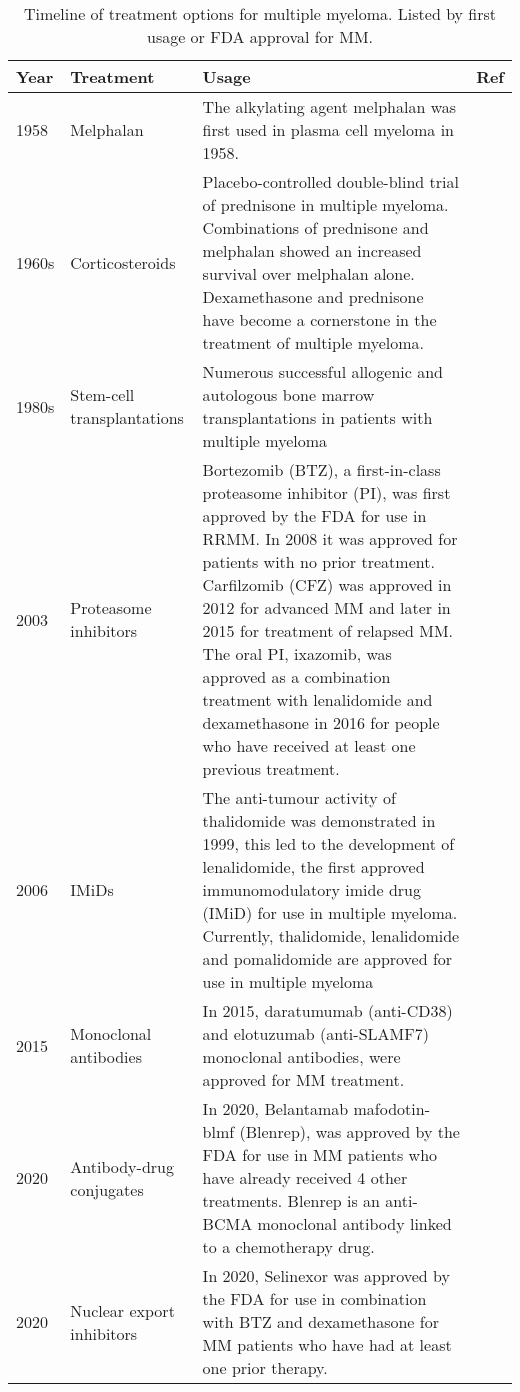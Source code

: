 %
%
\begin{table}[hpt]
\centering
\begin{tabular}{|p{1cm}|p{2.8cm}|p{8.3cm}|p{1.28cm}|}
\hline
\textbf{Year} & \textbf{Treatment} & \textbf{Usage} & \textbf{Ref} \\ \hline
1958 & Melphalan & The alkylating agent melphalan was first used in plasma cell myeloma in 1958. & \cite{blokhin1958clinical} \\ \hline
1960s & Corticosteroids & Placebo-controlled double-blind trial of prednisone in multiple myeloma. Combinations of prednisone and melphalan showed an increased survival over melphalan alone. Dexamethasone and prednisone have become a cornerstone in the treatment of multiple myeloma. & \cite{mass1962comparison, alexanian1969treatment} \\ \hline
1980s & Stem-cell transplantations & Numerous successful allogenic and autologous bone marrow transplantations in patients with multiple myeloma &  \cite{mcelwain1983high, osserman1982identical, fefer1986identical, gahrton1987bone}  \\ \hline
2003 & Proteasome inhibitors & Bortezomib (BTZ), a first-in-class proteasome inhibitor (PI), was first approved by the FDA for use in RRMM. In 2008 it was approved for patients with no prior treatment. Carfilzomib (CFZ) was approved in 2012 for advanced MM and later in 2015 for treatment of relapsed MM. The oral PI, ixazomib, was approved as a combination treatment with lenalidomide and dexamethasone in 2016 for people who have received at least one previous treatment. & \cite{kane2003velcade,richardson2003phase,katsnelson2012next} \\ \hline
2006 & IMiDs & The anti-tumour activity of thalidomide was demonstrated in 1999, this led to the development of lenalidomide, the first approved immunomodulatory imide drug (IMiD) for use in multiple myeloma. Currently, thalidomide, lenalidomide and pomalidomide are approved for use in multiple myeloma & \cite{singhal1999antitumor,label47revlimid,san2013pomalidomide} \\ \hline
2015 & Monoclonal antibodies & In 2015, daratumumab (anti-CD38) and elotuzumab (anti-SLAMF7) monoclonal antibodies, were approved for MM treatment. & \cite{lokhorst2015targeting,lonial2015elotuzumab} \\ \hline
2020 & Antibody-drug conjugates & In 2020, Belantamab mafodotin-blmf (Blenrep), was approved by the FDA for use in MM patients who have already received 4 other treatments. Blenrep is an anti-BCMA monoclonal antibody linked to a chemotherapy drug. & \cite{fdaBlenrep, markham2020belantamab} \\ \hline
2020 & Nuclear export inhibitors & In 2020, Selinexor was approved by the FDA for use in combination with BTZ and dexamethasone for MM patients who have had at least one prior therapy.& \cite{fdaselinexor, podar2020selinexor} \\ \hline
\end{tabular}
\caption[Timeline of treatment options for multiple myeloma]{Timeline of treatment options for multiple myeloma. Listed by first usage or FDA approval for MM.}
\label{tab:treatment_history}
\end{table}
%
